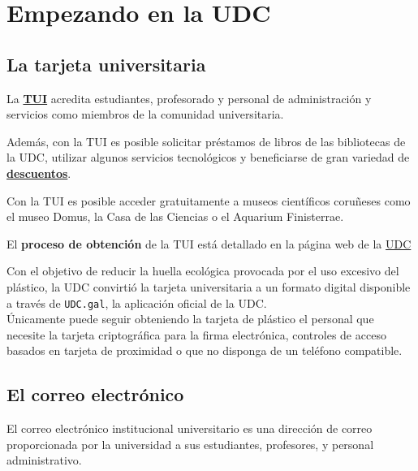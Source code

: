 \chapter{Empezando en la UDC}

\section{La tarjeta universitaria}

La \href{https://www.udc.es/es/tui/}{\textbf{\acrfull{TUI}}} acredita estudiantes, profesorado y personal de administración y servicios como miembros de la comunidad universitaria.

Además, con la \acrshort{TUI} es posible solicitar préstamos de libros de las bibliotecas de la \acrshort{UDC}, utilizar algunos servicios tecnológicos y beneficiarse de gran variedad de \href{https://www.udc.es/es/tui/guias_comerciais/}{\textbf{descuentos}}.

\begin{exampleBox}
    Con la \acrfull{TUI} es posible acceder gratuitamente a museos científicos coruñeses como el museo Domus, la Casa de las Ciencias o el Aquarium Finisterrae.
\end{exampleBox}

El \textbf{proceso de obtención} de la \acrshort{TUI} está detallado en la página web de la \href{https://www.udc.es/es/tui/emision/}{\acrshort{UDC}}

\begin{curiosityBox}
    Con el objetivo de reducir la huella ecológica provocada por el uso excesivo del plástico, la \acrshort{UDC} convirtió la tarjeta universitaria a un formato digital disponible a través de \texttt{UDC.gal}, la aplicación oficial de la \acrshort{UDC}.\\

    Únicamente puede seguir obteniendo la tarjeta de plástico el personal que necesite la tarjeta criptográfica para la firma electrónica, controles de acceso basados en tarjeta de proximidad o que no disponga de un teléfono compatible.
\end{curiosityBox}


\section{El correo electrónico}

El correo electrónico institucional universitario es una dirección de correo proporcionada por la universidad a sus estudiantes, profesores, y personal administrativo.


